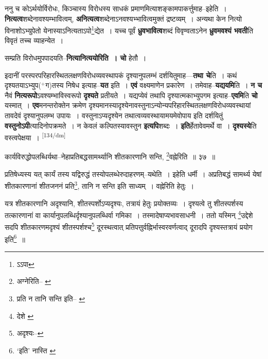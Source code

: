 \documentclass[article,12pt,a4paper]{memoir}
\newcommand{\add}[1]{($^{+}$#1)}
\begin{document}
	  \pstart ननु च कोऽर्थयोर्विरोधः, किञ्चास्य विरोधस्य साधकं प्रमाणमित्याशङ्कामपाकर्त्तुमाह--इहेति । \textbf{नित्यत्व}शब्देनावश्यम्भावित्वम्, \textbf{अनित्यत्व}शब्देनाऽनवश्यभ्भावित्वमुक्तं द्रष्टव्यम् । अन्यथा केन नित्यो विनाशोऽभ्युपेतो येनास्याऽनित्यताऽपो\footnote{ऽऽपा}द्येत । यच्च पूर्वं \textbf{ध्रुवभावित्व}शब्दं विवृण्वताऽनेन \textbf{ध्रुवमवश्यं भवती}ति विवृतं तच्च व्याहन्येत ।
	\pend
      

	  \pstart सम्प्रति विरोधमुपपादयति--\textbf{नित्यानित्ययोरिति । चो} हेतौ ।
	\pend
      

	  \pstart इदानीं परस्परपरिहारस्थितलक्षणविरोधव्यवस्थापकं दृश्यानुपलम्भं दर्शयितुमाह—\textbf{तथा चे}ति । कथं दृश्यतयाऽभ्युप\add{ग}तस्य निषेध इत्याह--\textbf{यत} इति । \textbf{एवं} वक्ष्यमाणेन प्रकारेण । तमेवाह--\textbf{यद्ययमि}ति । \textbf{न च} नैवं \textbf{नित्यरूपो}ऽवश्यम्भाविस्वरूपो \textbf{दृश्यते} प्रतीयते । यद्यप्येवं तथापि दृश्यात्मकाभ्युपगम इत्याह--\textbf{एवमि}ति \textbf{चो} यस्मात् । \textbf{एव}मनन्तरोक्तेन क्रमेण दृश्यमानस्यादृश्येनावस्तुनाऽन्योन्यपरिहारस्थितलक्षणविरोधव्यवस्थायां तावदेवं दृश्यानुपलम्भ उपायः । वस्तुनाऽप्यदृश्येन तथात्वव्यवस्थायामयमेवोपाय इति दर्शयितुं \textbf{वस्तुनोऽपी}त्यादिनोपक्रमते । न केवलं कल्पितस्यावस्तुन \textbf{इत्यपि}शब्दः । \textbf{इति}र्हेतावेवमर्थे वा । \textbf{दृश्यस्ये}ति वस्त्वपेक्षया ।
	\pend
      \leavevmode\textsuperscript{\rmlatinfont\tiny [134/dm]}

	  \pstart कार्यविरुद्धोपलब्धिर्यथा--नेहाप्रतिबद्धसामर्थ्यानि शीतकारणानि सन्ति, \footnote{अग्नेरिति--\cite{dp-msB} \cite{dp-msC} \cite{dp-edP} \cite{dp-edH} \cite{dp-edE} \cite{dp-edN}}वह्नेरिति ॥ ३७ ॥
	\pend
       

	  \pstart प्रतिषेध्यस्य यत् कार्यं तस्य यद्विरुद्धं तस्योपलब्धेरुदाहरणम्--यथेति । इहेति धर्मी । अप्रतिबद्धं सामर्थ्य येषां शीतकारणानां शीतजननं प्रति\footnote{प्रति न तानि सन्ति इति--\cite{dp-msA} \cite{dp-edP} \cite{dp-edH} \cite{dp-edE} \cite{dp-edN}}, तानि न सन्ति इति साध्यम् । वह्नेरिति हेतुः ।
	\pend
       

	  \pstart यत्र शीतकारणानि अदृश्यानि, शीतस्पर्शोऽप्यदृश्यः, तत्रायं हेतुः प्रयोक्तव्यः । दृश्यत्वे तु शीतस्पर्शस्य तत्कारणानां वा कार्यानुपलब्धिर्दृश्यानुपलब्धिर्वा गमिका । तस्मादेषाप्यभावसाधनी । ततो यस्मिन् \footnote{देशे \cite{dp-msA} \cite{dp-msB} \cite{dp-msC} \cite{dp-msD} \cite{dp-edP} \cite{dp-edH} \cite{dp-edE} \cite{dp-edN}}उद्देशे सदपि शीतकारणमदृश्यं शीतस्पर्शश्च\footnote{अदृश्यः--\cite{dp-msD-n}} दूरस्थत्वात् प्रतिपत्तुर्वह्निर्भास्वरवर्णत्वाद् दूरादपि दृश्यस्तत्रायं प्रयोग इति\footnote{‘इति’ नास्ति \cite{dp-msA} \cite{dp-msB} \cite{dp-edP} \cite{dp-edH} \cite{dp-edE} \cite{dp-edN}} ॥
	\pend
      
\end{document}
